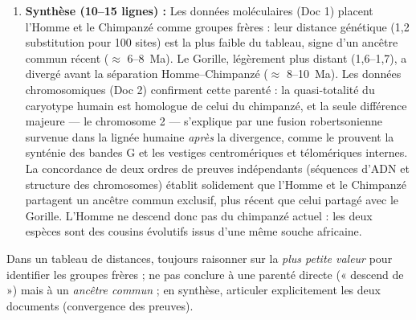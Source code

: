 \documentclass[11pt]{article}
\begin{document}
\begin{corrige}
\begin{enumerate}
    \item \textbf{Synthèse (10--15 lignes) :} Les données moléculaires (Doc 1) placent l'Homme et le Chimpanzé comme groupes frères : leur distance génétique (1,2 substitution pour 100 sites) est la plus faible du tableau, signe d'un ancêtre commun récent ($\approx$ 6--\SI{8}{Ma}). Le Gorille, légèrement plus distant (1,6--1,7), a divergé avant la séparation Homme--Chimpanzé ($\approx$ 8--\SI{10}{Ma}). Les données chromosomiques (Doc 2) confirment cette parenté : la quasi-totalité du caryotype humain est homologue de celui du chimpanzé, et la seule différence majeure — le chromosome 2 — s'explique par une fusion robertsonienne survenue dans la lignée humaine \emph{après} la divergence, comme le prouvent la synténie des bandes G et les vestiges centromériques et télomériques internes. La concordance de deux ordres de preuves indépendants (séquences d'ADN et structure des chromosomes) établit solidement que l'Homme et le Chimpanzé partagent un ancêtre commun exclusif, plus récent que celui partagé avec le Gorille. L'Homme ne descend donc pas du chimpanzé actuel : les deux espèces sont des cousins évolutifs issus d'une même souche africaine.
\end{enumerate}
\end{corrige}

\begin{attention}
Dans un tableau de distances, toujours raisonner sur la \emph{plus petite valeur} pour identifier les groupes frères ; ne pas conclure à une parenté directe (« descend de ») mais à un \emph{ancêtre commun} ; en synthèse, articuler explicitement les deux documents (convergence des preuves).
\end{attention}
\end{document}
